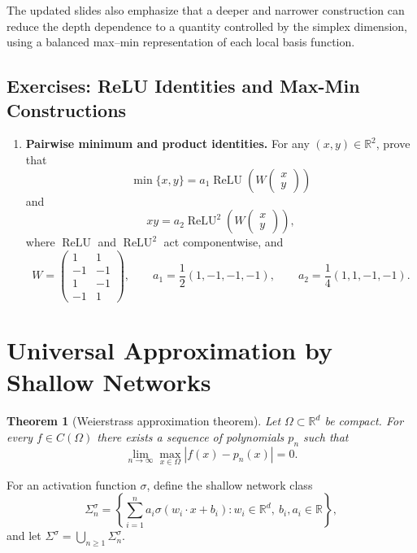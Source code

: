 \documentclass[11pt,a4paper]{article}
\newcommand{\R}{\mathbb{R}}
\newcommand{\ReLU}{\operatorname{ReLU}}
\theoremstyle{definition}
\theoremstyle{plain}
\newtheorem{theorem}{Theorem}[section]
\theoremstyle{remark}
\theoremstyle{plain}
\begin{document}
The updated slides also emphasize that a deeper and narrower construction can reduce the depth dependence to a quantity controlled by the simplex dimension, using a balanced max--min representation of each local basis function.



\subsection*{Exercises: ReLU Identities and Max-Min Constructions}
\begin{enumerate}[label=\textbf{Exercise \arabic*.},leftmargin=2.6em]
  \item \textbf{Pairwise minimum and product identities.}
  For any $(x,y)\in\mathbb R^2$, prove that
  \[
    \min\{x,y\}=a_1\ReLU\left(W\begin{pmatrix}x\\y\end{pmatrix}\right)
  \]
  and
  \[
    xy=a_2\ReLU^2\left(W\begin{pmatrix}x\\y\end{pmatrix}\right),
  \]
  where $\ReLU$ and $\ReLU^2$ act componentwise, and
  \[
    W=
    \begin{pmatrix}
      1&1\\
      -1&-1\\
      1&-1\\
      -1&1
    \end{pmatrix},
    \qquad
    a_1=\frac12(1,-1,-1,-1),
    \qquad
    a_2=\frac14(1,1,-1,-1).
  \]
\end{enumerate}

\section{Universal Approximation by Shallow Networks}

\begin{theorem}[Weierstrass approximation theorem]
Let $\Omega\subset\R^d$ be compact. For every $f\in C(\Omega)$ there exists a sequence of polynomials $p_n$ such that
\[
  \lim_{n\to\infty}\max_{x\in\Omega}|f(x)-p_n(x)|=0.
\]
\end{theorem}

For an activation function $\sigma$, define the shallow network class
\[
  \Sigma_n^\sigma
  =\left\{\sum_{i=1}^na_i\sigma(w_i\cdot x+b_i):
  w_i\in\R^d,\ b_i,a_i\in\R\right\},
\]
and let $\Sigma^\sigma=\bigcup_{n\ge1}\Sigma_n^\sigma$.
\end{document}
